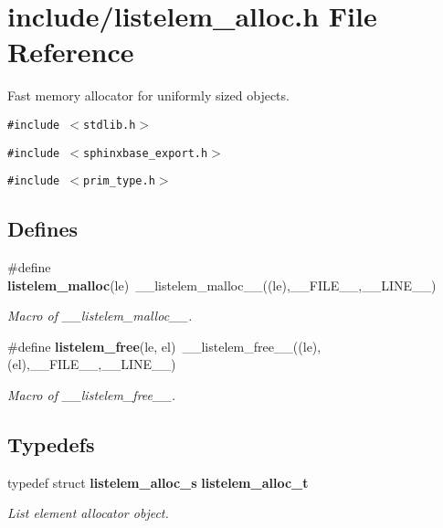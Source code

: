 \section{include/listelem\_\-alloc.h File Reference}
\label{listelem__alloc_8h}
Fast memory allocator for uniformly sized objects.  


{\tt \#include $<$stdlib.h$>$}\par
{\tt \#include $<$sphinxbase\_\-export.h$>$}\par
{\tt \#include $<$prim\_\-type.h$>$}\par
\subsection*{Defines}
\begin{CompactItemize}
\item 
\#define {\bf listelem\_\-malloc}(le)~\_\-\_\-listelem\_\-malloc\_\-\_\-((le),\_\-\_\-FILE\_\-\_\-,\_\-\_\-LINE\_\-\_\-)\label{listelem__alloc_8h_d0c40e65d9cca0d7ec08fcf416b09af2}

\begin{CompactList}\small\item\em Macro of \_\-\_\-listelem\_\-malloc\_\-\_\-. \item\end{CompactList}\item 
\#define {\bf listelem\_\-free}(le, el)~\_\-\_\-listelem\_\-free\_\-\_\-((le),(el),\_\-\_\-FILE\_\-\_\-,\_\-\_\-LINE\_\-\_\-)\label{listelem__alloc_8h_67de661d7ca552347fa6f03005e25d74}

\begin{CompactList}\small\item\em Macro of \_\-\_\-listelem\_\-free\_\-\_\-. \item\end{CompactList}\end{CompactItemize}
\subsection*{Typedefs}
\begin{CompactItemize}
\item 
typedef struct {\bf listelem\_\-alloc\_\-s} {\bf listelem\_\-alloc\_\-t}\label{listelem__alloc_8h_3fd3950d7834feaa2bbdf84afb98ce32}

\begin{CompactList}\small\item\em List element allocator object. \item\end{CompactList}\end{CompactItemize}
